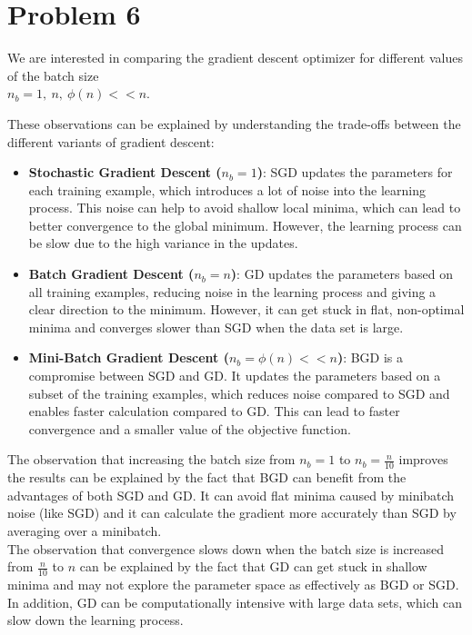 
\section{Problem 6}

We are interested in comparing the gradient descent optimizer for different values of the batch size \\
$n_b = 1,\ n,\ \phi(n) << n$. 

These observations can be explained by understanding the trade-offs between the different variants of gradient descent:
\begin{itemize}
	\item \textbf{Stochastic Gradient Descent ($n_b=1$)}: SGD updates the parameters for each training example, which introduces a lot of noise into the learning process. This noise can help to avoid shallow local minima, which can lead to better convergence to the global minimum. However, the learning process can be slow due to the high variance in the updates.
	\item \textbf{Batch Gradient Descent ($n_b=n$)}: GD updates the parameters based on all training examples, reducing noise in the learning process and giving a clear direction to the minimum. However, it can get stuck in flat, non-optimal minima and converges slower than SGD when the data set is large.
	\item \textbf{Mini-Batch Gradient Descent ($n_b=\phi(n) << n$)}: BGD is a compromise between SGD and GD. It updates the parameters based on a subset of the training examples, which reduces noise compared to SGD and enables faster calculation compared to GD. This can lead to faster convergence and a smaller value of the objective function.
\end{itemize}

The observation that increasing the batch size from $n_b=1$ to $n_b=\frac{n}{10}$ improves the results can be explained by the fact that BGD can benefit from the advantages of both SGD and GD. It can avoid flat minima caused by minibatch noise (like SGD) and it can calculate the gradient more accurately than SGD by averaging over a minibatch.\\
The observation that convergence slows down when the batch size is increased from $\frac{n}{10}$ to $n$ can be explained by the fact that GD can get stuck in shallow minima and may not explore the parameter space as effectively as BGD or SGD. In addition, GD can be computationally intensive with large data sets, which can slow down the learning process.